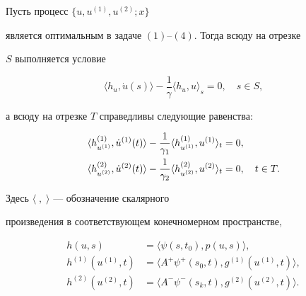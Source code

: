 \begin{thm}


Пусть процесс $\{u, u^{(1)}, u^{(2)}; x\}$


является оптимальным в задаче $(1)$--$(4)$. Тогда всюду на отрезке


$S$ выполняется условие


\begin{equation}


\langle h_u, \Dot{u} (s) \rangle


-\frac{1}{\gamma} \langle h_u,u \rangle_s = 0, \quad s\in S,


\end{equation}


а всюду на отрезке $T$ справедливы следующие равенства\/${:}$


\begin{align}


\langle h^{(1)}_{u^{(1)}}, \Dot{u}^{(1)} (t) \rangle


-\frac{1}{\gamma_1} \langle h^{(1)}_{u^{(1)}},u^{(1)} \rangle_t


&= 0,\notag \\


\langle h^{(2)}_{u^{(2)}}, \Dot{u}^{(2)} (t) \rangle


-\frac{1}{\gamma_2} \langle h^{(2)}_{u^{(2)}},u^{(2)} \rangle_t


&= 0, \quad t\in T.


\end{align}


\end{thm}





Здесь $\langle \; , \; \rangle$ --- обозначение скалярного


произведения в соответствующем конечномерном пространстве,


\begin{align*}


h(u,s) &= \langle \psi (s,t_0), p(u,s) \rangle, \\


h^{(1)}(u^{(1)},t) &= \langle A^+ \psi^+ (s_0,t), g^{(1)}


(u^{(1)},t) \rangle,\\


h^{(2)}(u^{(2)},t) &= \langle A^- \psi^- (s_k,t), g^{(2)}


(u^{(2)},t) \rangle.


\end{align*}


